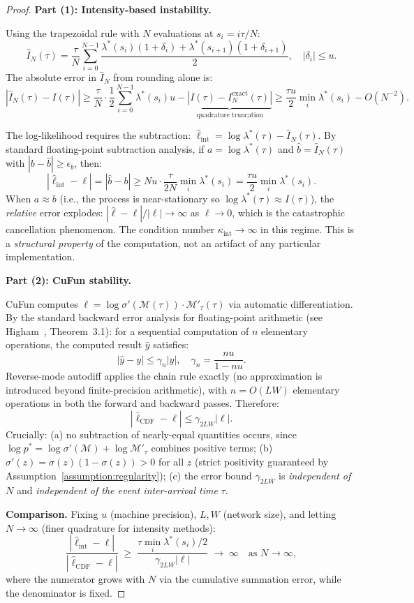 \begin{proof}
\textbf{Part (1): Intensity-based instability.}

Using the trapezoidal rule with $N$ evaluations at $s_i = i\tau/N$:
\[
\hat{I}_N(\tau) = \frac{\tau}{N}\sum_{i=0}^{N-1}
\frac{\lambda^*(s_i)(1+\delta_i) + \lambda^*(s_{i+1})(1+\delta_{i+1})}{2},
\quad |\delta_i| \leq u.
\]
The absolute error in $\hat{I}_N$ from rounding alone is:
\[
|\hat{I}_N(\tau) - I(\tau)| \geq \frac{\tau}{N} \cdot \frac{1}{2}
\sum_{i=0}^{N-1} \lambda^*(s_i) u
- \underbrace{|I(\tau) - I_N^{\text{exact}}(\tau)|}_{\text{quadrature truncation}}
\geq \frac{\tau u}{2} \min_i \lambda^*(s_i) - O(N^{-2}).
\]

The log-likelihood requires the subtraction:
$\hat{\ell}_{\text{int}} = \log\lambda^*(\tau) - \hat{I}_N(\tau)$.
By standard floating-point subtraction analysis, if $a = \log\lambda^*(\tau)$
and $\hat{b} = \hat{I}_N(\tau)$ with $|{b} - \hat{b}| \geq \epsilon_b$, then:
\[
|\hat{\ell}_{\text{int}} - \ell|
= |\hat{b} - {b}| \geq Nu \cdot \frac{\tau}{2N}\min_i\lambda^*(s_i)
= \frac{\tau u}{2} \min_i \lambda^*(s_i).
\]
When $a \approx b$ (i.e., the process is near-stationary so
$\log\lambda^*(\tau) \approx I(\tau)$), the \emph{relative} error explodes:
$|\hat{\ell} - \ell|/|\ell| \to \infty$ as $\ell \to 0$, which is the
catastrophic cancellation phenomenon. The condition number $\kappa_{\text{int}}
\to \infty$ in this regime. This is a \emph{structural property}
of the computation, not an artifact of any particular implementation.

\textbf{Part (2): CuFun stability.}

CuFun computes $\ell = \log\sigma'(\mathcal{M}(\tau))\cdot\mathcal{M}'_\tau(\tau)$
via automatic differentiation. By the standard backward error analysis for
floating-point arithmetic (see Higham~\cite{higham2002accuracy}, Theorem~3.1):
for a sequential computation of $n$ elementary operations, the computed result
$\hat{y}$ satisfies:
\[
|\hat{y} - y| \leq \gamma_n |y|, \quad \gamma_n = \frac{nu}{1-nu}.
\]
Reverse-mode autodiff applies the chain rule exactly (no approximation is introduced
beyond finite-precision arithmetic), with $n = O(LW)$ elementary operations
in both the forward and backward passes. Therefore:
\[
|\hat{\ell}_{\text{CDF}} - \ell| \leq \gamma_{2LW} |\ell|.
\]
Crucially: (a) no subtraction of nearly-equal quantities occurs,
since $\log p^* = \log\sigma'(\mathcal{M}) + \log\mathcal{M}'_\tau$ combines
positive terms; (b) $\sigma'(z) = \sigma(z)(1-\sigma(z)) > 0$ for all $z$
(strict positivity guaranteed by Assumption~\ref{assumption:regularity});
(c) the error bound $\gamma_{2LW}$ is \emph{independent of $N$} and
\emph{independent of the event inter-arrival time} $\tau$.

\textbf{Comparison.}
Fixing $u$ (machine precision), $L, W$ (network size), and letting $N \to \infty$
(finer quadrature for intensity methods):
\[
\frac{|\hat{\ell}_{\text{int}} - \ell|}{|\hat{\ell}_{\text{CDF}} - \ell|}
\;\geq\; \frac{\tau\min_i\lambda^*(s_i) / 2}{\gamma_{2LW}|\ell|}
\;\to\; \infty \quad \text{as } N\to\infty,
\]
where the numerator grows with $N$ via the cumulative summation error,
while the denominator is fixed.
\end{proof}

